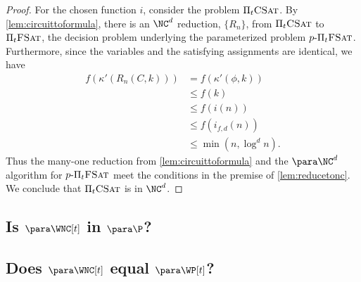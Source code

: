 \begin{proof}
  For the chosen function $i$, consider the problem $\Pi_t \textsc{CSat}$.
  By \autoref{lem:circuittoformula}, there is an $\NC^d$ reduction, $\{R_n\}$, from $\Pi_t \textsc{CSat}$ to $\Pi_t \textsc{FSat}$, the decision problem underlying the parameterized problem $p \textnormal{-} \Pi_t \textsc{FSat}$.
  Furthermore, since the variables and the satisfying assignments are identical, we have
  \begin{align*}
    f(\kappa'(R_n(C, k))) & = f(\kappa'(\phi, k)) \\
    & \leq f(k) \\
    & \leq f(i(n)) \\
    & \leq f(i_{f, d}(n)) \\
    & \leq \min(n, \log^d n).
  \end{align*}
  Thus the many-one reduction from \autoref{lem:circuittoformula} and the $\para \NC^d$ algorithm for $p \textnormal{-} \Pi_t \textsc{FSat}$ meet the conditions in the premise of \autoref{lem:reducetonc}.
  We conclude that $\Pi_t \textsc{CSat}$ is in $\NC^d$.
\end{proof}

\subsection{Is \texorpdfstring{$\para \WNC[t]$}{paraWNC[t]} in \texorpdfstring{$\para \P$}{paraP}?}


\subsection{Does \texorpdfstring{$\para \WNC[t]$}{paraWNC[t]} equal \texorpdfstring{$\para \WP[t]$}{paraWP[t]}?}

